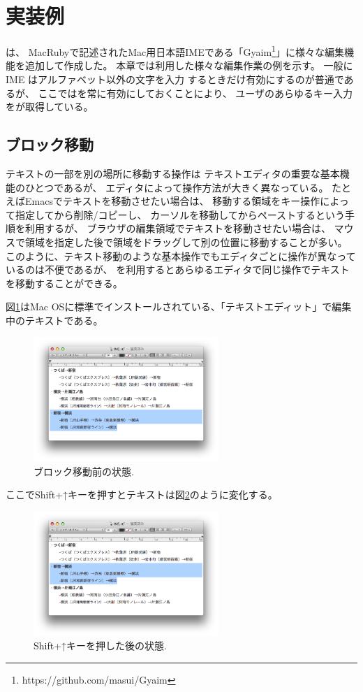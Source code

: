 \section{実装例}

{\system}は、
MacRubyで記述されたMac用日本語IMEである「Gyaim\footnote{
 \textsf{https://github.com/masui/Gyaim}
}」に様々な編集機能を追加して作成した。
本章では{\system}利用した様々な編集作業の例を示す。
一般にIME はアルファベット以外の文字を入力
するときだけ有効にするのが普通であるが、
ここでは{\system}を常に有効にしておくことにより、
ユーザのあらゆるキー入力を{\system}が取得している。

\subsection{ブロック移動}

テキストの一部を別の場所に移動する操作は
テキストエディタの重要な基本機能のひとつであるが、
エディタによって操作方法が大きく異なっている。
たとえばEmacsでテキストを移動させたい場合は、
移動する領域をキー操作によって指定してから削除/コピーし、
カーソルを移動してからペーストするという手順を利用するが、
ブラウザの編集領域でテキストを移動させたい場合は、
マウスで領域を指定した後で領域をドラッグして別の位置に移動することが多い。
このように、テキスト移動のような基本操作でもエディタごとに操作が異なっているのは不便であるが、
{\system}を利用するとあらゆるエディタで同じ操作でテキストを移動することができる。

図\ref{move1}はMac OSに標準でインストールされている、「テキストエディット」で編集中のテキストである。

\begin{figure}[H]
\centerline{\includegraphics[width=70mm,bb=0 0 703 472]{figures/block2.png}}
\caption{ブロック移動前の状態.}
\label{move1}
\end{figure}

ここでShift+↑キーを押すとテキストは図\ref{move2}のように変化する。

\begin{figure}[H]
\centerline{\includegraphics[width=70mm,bb=0 0 703 472]{figures/block3.png}}
\caption{Shift+↑キーを押した後の状態.}
\label{move2}
\end{figure}

